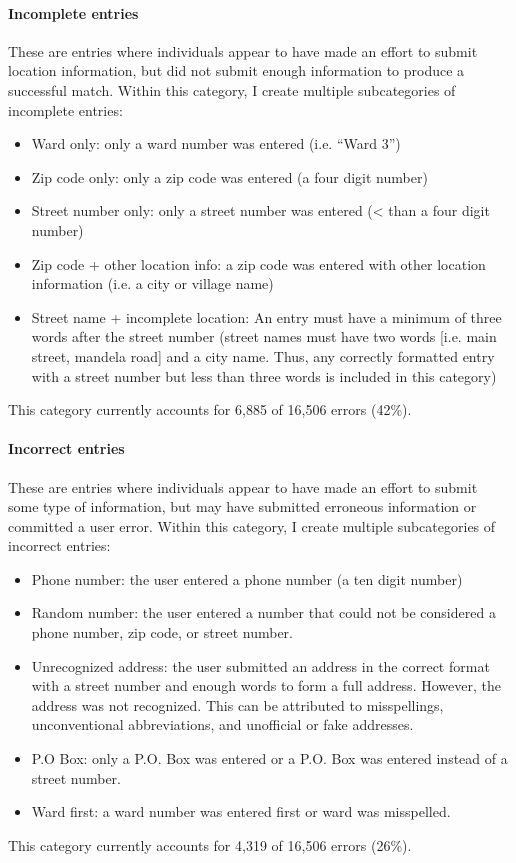 \documentclass[12pt]{article}
\begin{document}
\paragraph{Incomplete entries} These are entries where individuals appear to have made an effort to submit location information, but did not submit enough information to produce a successful match. Within this category, I create multiple subcategories of incomplete entries: 
\begin{itemize}
\item Ward only: only a ward number was entered (i.e. ``Ward 3'')
\item Zip code only: only a zip code was entered (a four digit number)
\item Street number only: only a street number was entered (< than a four digit number)
\item Zip code + other location info: a zip code was entered with other location information (i.e. a city or village name)
\item Street name + incomplete location: An entry must have a minimum of three words after the street number (street names must have two words [i.e. main street, mandela road] and a city name. Thus, any correctly formatted entry with a street number but less than three words is included in this category) 
\end{itemize}
This category currently accounts for 6,885 of 16,506 errors (42\%). 

\paragraph{Incorrect entries} These are entries where individuals appear to have made an effort to submit some type of information, but may have submitted erroneous information or committed a user error. Within this category, I create multiple subcategories of incorrect entries: 
\begin{itemize}
\item Phone number: the user entered a phone number (a ten digit number)
\item Random number: the user entered a number that could not be considered a phone number, zip code, or street number.
\item Unrecognized address: the user submitted an address in the correct format with a street number and enough words to form a full address. However, the address was not recognized. This can be attributed to misspellings, unconventional abbreviations, and unofficial or fake addresses.
\item P.O Box: only a P.O. Box was entered or a P.O. Box was entered instead of a street number. 
\item Ward first: a ward number was entered first or ward was misspelled.
\end{itemize}
This category currently accounts for  4,319 of 16,506 errors (26\%). 
\end{document}

